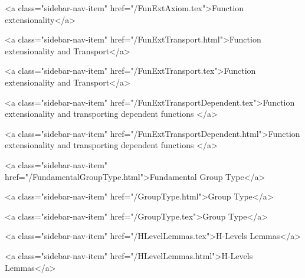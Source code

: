       
    
      
        
          <a class="sidebar-nav-item" href="/FunExtAxiom.tex">Function extensionality</a>
        
      
    
      
        
          <a class="sidebar-nav-item" href="/FunExtTransport.html">Function extensionality and Transport</a>
        
      
    
      
        
          <a class="sidebar-nav-item" href="/FunExtTransport.tex">Function extensionality and Transport</a>
        
      
    
      
        
          <a class="sidebar-nav-item" href="/FunExtTransportDependent.tex">Function extensionality and transporting dependent functions </a>
        
      
    
      
        
          <a class="sidebar-nav-item" href="/FunExtTransportDependent.html">Function extensionality and transporting dependent functions </a>
        
      
    
      
        
          <a class="sidebar-nav-item" href="/FundamentalGroupType.html">Fundamental Group Type</a>
        
      
    
      
        
          <a class="sidebar-nav-item" href="/GroupType.html">Group Type</a>
        
      
    
      
        
          <a class="sidebar-nav-item" href="/GroupType.tex">Group Type</a>
        
      
    
      
        
          <a class="sidebar-nav-item" href="/HLevelLemmas.tex">H-Levels Lemmas</a>
        
      
    
      
        
          <a class="sidebar-nav-item" href="/HLevelLemmas.html">H-Levels Lemmas</a>
        
      
    
